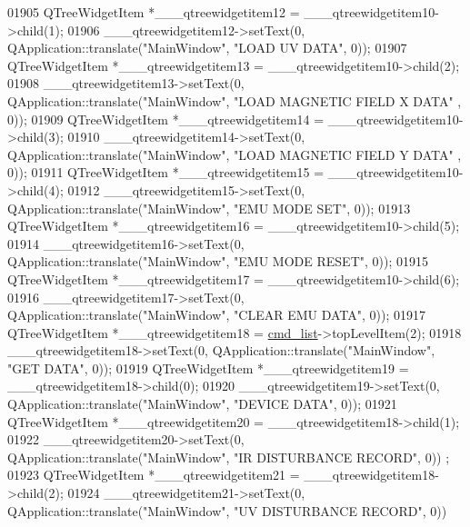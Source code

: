 \begin{DoxyCode}
01905         QTreeWidgetItem *\_\_\_qtreewidgetitem12 = \_\_\_qtreewidgetitem10->child(1);
01906         \_\_\_qtreewidgetitem12->setText(0, QApplication::translate(\textcolor{stringliteral}{"MainWindow"}, \textcolor{stringliteral}{"LOAD UV DATA"}, 0));
01907         QTreeWidgetItem *\_\_\_qtreewidgetitem13 = \_\_\_qtreewidgetitem10->child(2);
01908         \_\_\_qtreewidgetitem13->setText(0, QApplication::translate(\textcolor{stringliteral}{"MainWindow"}, \textcolor{stringliteral}{"LOAD MAGNETIC FIELD X DATA"}
      , 0));
01909         QTreeWidgetItem *\_\_\_qtreewidgetitem14 = \_\_\_qtreewidgetitem10->child(3);
01910         \_\_\_qtreewidgetitem14->setText(0, QApplication::translate(\textcolor{stringliteral}{"MainWindow"}, \textcolor{stringliteral}{"LOAD MAGNETIC FIELD Y DATA"}
      , 0));
01911         QTreeWidgetItem *\_\_\_qtreewidgetitem15 = \_\_\_qtreewidgetitem10->child(4);
01912         \_\_\_qtreewidgetitem15->setText(0, QApplication::translate(\textcolor{stringliteral}{"MainWindow"}, \textcolor{stringliteral}{"EMU MODE SET"}, 0));
01913         QTreeWidgetItem *\_\_\_qtreewidgetitem16 = \_\_\_qtreewidgetitem10->child(5);
01914         \_\_\_qtreewidgetitem16->setText(0, QApplication::translate(\textcolor{stringliteral}{"MainWindow"}, \textcolor{stringliteral}{"EMU MODE RESET"}, 0));
01915         QTreeWidgetItem *\_\_\_qtreewidgetitem17 = \_\_\_qtreewidgetitem10->child(6);
01916         \_\_\_qtreewidgetitem17->setText(0, QApplication::translate(\textcolor{stringliteral}{"MainWindow"}, \textcolor{stringliteral}{"CLEAR EMU DATA"}, 0));
01917         QTreeWidgetItem *\_\_\_qtreewidgetitem18 = \hyperlink{a00080_aa66ece71395b435e915d384fb63bac1d}{cmd\_list}->topLevelItem(2);
01918         \_\_\_qtreewidgetitem18->setText(0, QApplication::translate(\textcolor{stringliteral}{"MainWindow"}, \textcolor{stringliteral}{"GET DATA"}, 0));
01919         QTreeWidgetItem *\_\_\_qtreewidgetitem19 = \_\_\_qtreewidgetitem18->child(0);
01920         \_\_\_qtreewidgetitem19->setText(0, QApplication::translate(\textcolor{stringliteral}{"MainWindow"}, \textcolor{stringliteral}{"DEVICE DATA"}, 0));
01921         QTreeWidgetItem *\_\_\_qtreewidgetitem20 = \_\_\_qtreewidgetitem18->child(1);
01922         \_\_\_qtreewidgetitem20->setText(0, QApplication::translate(\textcolor{stringliteral}{"MainWindow"}, \textcolor{stringliteral}{"IR DISTURBANCE RECORD"}, 0))
      ;
01923         QTreeWidgetItem *\_\_\_qtreewidgetitem21 = \_\_\_qtreewidgetitem18->child(2);
01924         \_\_\_qtreewidgetitem21->setText(0, QApplication::translate(\textcolor{stringliteral}{"MainWindow"}, \textcolor{stringliteral}{"UV DISTURBANCE RECORD"}, 0))

\end{DoxyCode}
